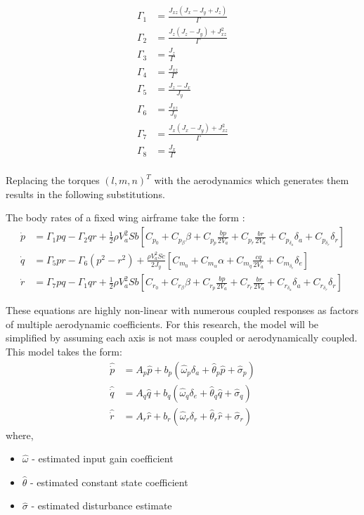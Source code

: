 \begin{equation}
\begin{split}
\Gamma_1&=\frac{J_{xz}(J_x-J_y+J_z)}{\Gamma}\\
\Gamma_2&=\frac{J_z(J_z-J_y)+J_{xz}^2}{\Gamma}\\
\Gamma_3&=\frac{J_z}{\Gamma}\\
\Gamma_4&=\frac{J_{xz}}{\Gamma}\\
\Gamma_5&=\frac{J_z-J_x}{J_y}\\
\Gamma_6&=\frac{J_{xz}}{J_y}\\
\Gamma_7&=\frac{J_x(J_x-J_y)+J_{xz}^2}{\Gamma}\\
\Gamma_8&=\frac{J_x}{\Gamma}\\
\end{split}
\end{equation}

Replacing the torques $(l,m,n)^T$ with the aerodynamics which generates them results in the following substitutions.

The body rates of a fixed wing airframe take the form \cite{beard2012small}:
\begin{equation}
\begin{split}
	\dot{p}&=\Gamma_1pq-\Gamma_2qr+\frac{1}{2}\rho V_a^2Sb\left[C_{p_0}+C_{p_\beta}\beta+C_{p_p}\frac{bp}{2V_a}+C_{p_r}\frac{br}{2V_a}+C_{p_{\delta_a}}\delta_a+C_{p_{\delta_r}}\delta_r\right]\\
	\dot{q}&=\Gamma_5pr-\Gamma_6(p^2-r^2)+\frac{\rho V_a^2Sc}{2J_y}\left[C_{m_0}+C_{m_\alpha}\alpha+C_{m_q}\frac{cq}{2V_a}+C_{m_{\delta_e}}\delta_e\right]\\
	\dot{r}&=\Gamma_7pq-\Gamma_1qr+\frac{1}{2}\rho V_a^2Sb\left[C_{r_0}+C_{r_\beta}\beta+C_{r_p}\frac{bp}{2V_a}+C_{r_r}\frac{br}{2V_a}+C_{r_{\delta_a}}\delta_a+C_{r_{\delta_r}}\delta_r\right]
\end{split}	
\end{equation}

These equations are highly non-linear with numerous coupled responses as factors of multiple aerodynamic coefficients.  For this research, the model will be simplified by assuming each axis is not mass coupled or aerodynamically coupled.  This model takes the form:
\begin{equation}
\begin{split}
\hat{\dot{p}}&=A_p\hat{p}+b_p\left(\hat{\omega}_p\delta_a+\hat{\theta}_p\hat{p}+\hat{\sigma}_p\right)\\
\hat{\dot{q}}&=A_q\hat{q}+b_q\left(\hat{\omega}_q\delta_e+\hat{\theta}_q\hat{q}+\hat{\sigma}_q\right)\\
\hat{\dot{r}}&=A_r\hat{r}+b_r\left(\hat{\omega}_r\delta_r+\hat{\theta}_r\hat{r}+\hat{\sigma}_r\right)
\end{split}
\end{equation}
where,
\begin{itemize}
	\item[] $\hat{\omega}$ - estimated input gain coefficient
	\item[] $\hat{\theta}$ - estimated constant state coefficient
	\item[] $\hat{\sigma}$ - estimated disturbance estimate
\end{itemize}

